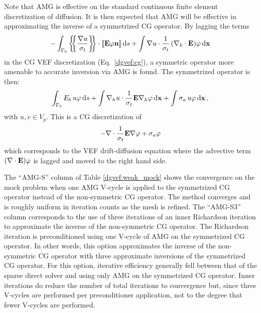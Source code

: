 \documentclass[../doc.tex]{subfiles}
\begin{document}
Note that AMG is effective on the standard continuous finite element discretization of diffusion. It is then expected that AMG will be effective in approximating the inverse of a symmetrized CG operator. By lagging the terms 
	\begin{equation}
		-\int_{\Gamma_0} \left\{\!\!\left\{\frac{\nabla u}{\sigma_t}\right\}\!\!\right\}\cdot \left\llbracket\boldsymbol{\mathrm{E}}\varphi\boldsymbol{\mathrm{n}} \right\rrbracket \mathop{}\!\mathrm{d} s + \int \nabla u \cdot \frac{1}{\sigma_t} \left( \nabla_h\cdot\boldsymbol{\mathrm{E}} \right)\!\varphi \mathop{}\!\mathrm{d} \boldsymbol{\mathrm{x}}
	\end{equation}
in the CG VEF discretization (Eq.~\ref{dgvef:cg}), a symmetric operator more amenable to accurate inversion via AMG is found. The symmetrized operator is then:
	\begin{equation}
		\int_{\Gamma_b} E_b\, u \varphi \mathop{}\!\mathrm{d} s + \int \nabla_h u \cdot \frac{1}{\sigma_t}\boldsymbol{\mathrm{E}} \nabla_h \varphi \mathop{}\!\mathrm{d} \boldsymbol{\mathrm{x}} + \int \sigma_a\, u \varphi \mathop{}\!\mathrm{d} \boldsymbol{\mathrm{x}} \,, 
	\end{equation}
with $u,v \in V_p$. 
This is a CG discretization of 
	\begin{equation}
		-\nabla \cdot \frac{1}{\sigma_t}\boldsymbol{\mathrm{E}}\nabla \varphi + \sigma_a \varphi 
	\end{equation} 
which corresponds to the VEF drift-diffusion equation where the advective term $\left( \nabla\cdot\boldsymbol{\mathrm{E}} \right)\!\varphi$ is lagged and moved to the right hand side. 

The ``AMG-S'' column of Table \ref{dgvef:weak_mock} shows the convergence on the mock problem when one AMG V-cycle is applied to the symmetrized CG operator instead of the non-symmetric CG operator. The method converges and is roughly uniform in iteration counts as the mesh is refined. The ``AMG-S3'' column corresponds to the use of three iterations of an inner Richardson iteration to approximate the inverse of the non-symmetric CG operator. The Richardson iteration is preconditioned using one V-cycle of AMG on the symmetrized CG operator. In other words, this option approximates the inverse of the non-symmetric CG operator with three approximate inversions of the symmetrized CG operator. For this option, iterative efficiency generally fell between that of the sparse direct solver and using only AMG on the symmetrized CG operator. Inner iterations do reduce the number of total iterations to convergence but, since three V-cycles are performed per preconditioner application, not to the degree that fewer V-cycles are performed.
\end{document}
